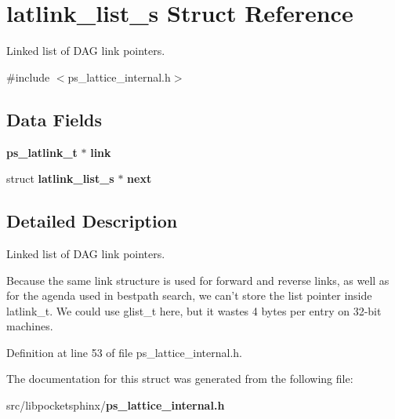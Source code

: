 \section{latlink\-\_\-list\-\_\-s Struct Reference}
\label{structlatlink__list__s}


Linked list of D\-A\-G link pointers.  




{\ttfamily \#include $<$ps\-\_\-lattice\-\_\-internal.\-h$>$}

\subsection*{Data Fields}
\begin{DoxyCompactItemize}
\item 
{\bf ps\-\_\-latlink\-\_\-t} $\ast$ {\bfseries link}\label{structlatlink__list__s_accd8f5fdb23871b66b81c830e3808068}

\item 
struct {\bf latlink\-\_\-list\-\_\-s} $\ast$ {\bfseries next}\label{structlatlink__list__s_a17b319bb0f536542267496afecc8de10}

\end{DoxyCompactItemize}


\subsection{Detailed Description}
Linked list of D\-A\-G link pointers. 

Because the same link structure is used for forward and reverse links, as well as for the agenda used in bestpath search, we can't store the list pointer inside latlink\-\_\-t. We could use glist\-\_\-t here, but it wastes 4 bytes per entry on 32-\/bit machines. 

Definition at line 53 of file ps\-\_\-lattice\-\_\-internal.\-h.



The documentation for this struct was generated from the following file\-:\begin{DoxyCompactItemize}
\item 
src/libpocketsphinx/{\bf ps\-\_\-lattice\-\_\-internal.\-h}\end{DoxyCompactItemize}
